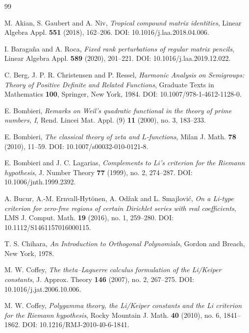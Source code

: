 \documentclass[preprint,12pt]{elsarticle}
\numberwithin{equation}{section}
\theoremstyle{plain}
\theoremstyle{definition}
\theoremstyle{remark}
\begin{document}
\begin{thebibliography}{99}

M. Akian, S. Gaubert and A. Niv,
\emph{Tropical compound matrix identities},
Linear Algebra Appl. \textbf{551} (2018), 162--206.
DOI: 10.1016/j.laa.2018.04.006.

I. Baraga\~na and A. Roca,
\emph{Fixed rank perturbations of regular matrix pencils},
Linear Algebra Appl. \textbf{589} (2020), 201--221.
DOI: 10.1016/j.laa.2019.12.022.

C. Berg, J. P. R. Christensen and P. Ressel,
\emph{Harmonic Analysis on Semigroups: Theory of Positive Definite and Related Functions},
Graduate Texts in Mathematics \textbf{100}, Springer, New York, 1984.
DOI: 10.1007/978-1-4612-1128-0.

E. Bombieri,
\emph{Remarks on Weil's quadratic functional in the theory of prime numbers, I},
Rend. Lincei Mat. Appl. (9) \textbf{11} (2000), no. 3, 183--233.


E. Bombieri,
\emph{The classical theory of zeta and $L$-functions},
Milan J. Math. \textbf{78} (2010), 11--59.
DOI: 10.1007/s00032-010-0121-8.

E. Bombieri and J. C. Lagarias,
\emph{Complements to Li's criterion for the Riemann hypothesis},
J. Number Theory \textbf{77} (1999), no. 2, 274--287.
DOI: 10.1006/jnth.1999.2392.


A. Bucur, A.-M. Ernvall-Hyt\"onen, A. Od\v{z}ak and L. Smajlovi\'c,
\emph{On a Li-type criterion for zero-free regions of certain Dirichlet series with real coefficients},
LMS J. Comput. Math. \textbf{19} (2016), no. 1, 259--280.
DOI: 10.1112/S1461157016000115.

T. S. Chihara,
\emph{An Introduction to Orthogonal Polynomials},
Gordon and Breach, New York, 1978.

M. W. Coffey,
\emph{The theta--Laguerre calculus formulation of the Li/Keiper constants},
J. Approx. Theory \textbf{146} (2007), no. 2, 267--275.
DOI: 10.1016/j.jat.2006.10.006.

M. W. Coffey,
\emph{Polygamma theory, the Li/Keiper constants and the Li criterion for the Riemann hypothesis},
Rocky Mountain J. Math. \textbf{40} (2010), no. 6, 1841--1862.
DOI: 10.1216/RMJ-2010-40-6-1841.


\end{thebibliography}
\end{document}

